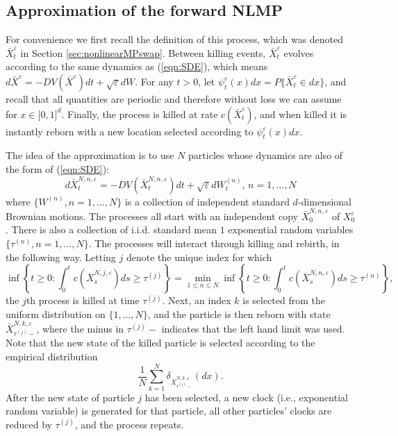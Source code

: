 \documentclass[english,11pt]{article}%
\numberwithin{equation}{section}
\numberwithin{example}{section}
\numberwithin{theorem}{section}
\begin{document}
\subsection{Approximation of the forward NLMP}

For convenience we first recall the definition of this process, which was
denoted $\bar{X}_{t}^{\varepsilon}$ in Section \ref{sec:nonlinearMPswap}.
Between killing events, $\bar{X}_{t}^{\varepsilon}$ evolves according to the
same dynamics as (\ref{eqn:SDE}), which means $d\bar{X}^{\varepsilon}%
=-DV(\bar{X}^{\varepsilon})dt+\sqrt{\varepsilon}dW$. For any $t>0$, let
$\psi_{t}^{\varepsilon}(x)dx=P\{\bar{X}_{t}^{\varepsilon}\in dx\}$, and recall
that all quantities are periodic and therefore without loss we can assume for
$x\in\lbrack0,1]^{d}$. Finally, the process is killed at rate $c(\bar{X}%
_{t}^{\varepsilon})$, and when killed it is instantly reborn with a new
location selected according to $\psi_{t}^{\varepsilon}(x)dx$.

The idea of the approximation is to use $N$ particles whose dynamics are
also of the form of (\ref{eqn:SDE}):%
\[
d\bar{X}_{t}^{N,n,\varepsilon}=-DV(\bar{X}_{t}^{N,n,\varepsilon}%
)dt+\sqrt{\varepsilon}dW_{t}^{(n)},\, n = 1, \ldots, N
\]
where $\{W^{(n)},n=1,\ldots,N\}$ is a collection of independent standard
$d$-dimensional Brownian motions. The processes all start with an independent
copy $\bar{X}_{0}^{N,n,\varepsilon}$ of $X_{0}^{\varepsilon}$. There is also a
collection of i.i.d. standard mean $1$ exponential random variables $\{\tau
^{(n)},n=1,\ldots,N\}$. The processes will interact through killing and
rebirth, in the following way. Letting $j$ denote the unique index for which
\[
\inf\left\{  t\geq0:\int_{0}^{t}c(\bar{X}_{s}^{N,j,\varepsilon})ds\geq
\tau^{(j)}\right\}  =\min_{1\leq n\leq N}\inf\left\{  t\geq0:\int_{0}%
^{t}c(\bar{X}_{s}^{N,n,\varepsilon})ds\geq\tau^{(n)}\right\}  ,
\]
the $j$th process is killed at time $\tau^{(j)}$. Next, an index $k$ is
selected from the uniform distribution on $\{1,\ldots,N\}$, and the particle
is then reborn with state $\bar{X}_{\tau^{(j)}-}^{N,k,\varepsilon}$, where the
minus in $\tau^{(j)}-$ indicates that the left hand limit was used. Note that
the new state of the killed particle is selected according to the empirical
distribution
\[
\frac{1}{N}\sum_{k=1}^{N}\delta_{\bar{X}_{\tau^{(j)}-}^{N,k,\varepsilon}%
}(dx).
\]
After the new state of particle $j$ has been selected, a new clock (i.e.,
exponential random variable) is generated for that particle, all other
particles' clocks are reduced by $\tau^{(j)}$, and the process repeats.
\end{document}
